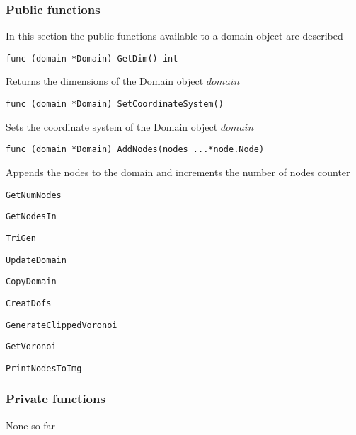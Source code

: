 \subsubsection*{Public functions}
In this section the public functions available to a domain object are described
\begin{lstlisting}
func (domain *Domain) GetDim() int 
\end{lstlisting}
Returns the dimensions of the Domain object $domain$
\begin{lstlisting}
func (domain *Domain) SetCoordinateSystem() 
\end{lstlisting}
Sets the coordinate system of the Domain object $domain$
\begin{lstlisting}
func (domain *Domain) AddNodes(nodes ...*node.Node) 
\end{lstlisting}
Appends the nodes to the domain and increments the number of nodes counter
\begin{lstlisting}
GetNumNodes
\end{lstlisting}
\begin{lstlisting}
GetNodesIn
\end{lstlisting}
\begin{lstlisting}
TriGen
\end{lstlisting}
\begin{lstlisting}
UpdateDomain
\end{lstlisting}
\begin{lstlisting}
CopyDomain
\end{lstlisting}
\begin{lstlisting}
CreatDofs
\end{lstlisting}
\begin{lstlisting}
GenerateClippedVoronoi
\end{lstlisting}

\begin{lstlisting}
GetVoronoi
\end{lstlisting}

\begin{lstlisting}
PrintNodesToImg
\end{lstlisting}



\subsubsection*{Private functions}
None so far